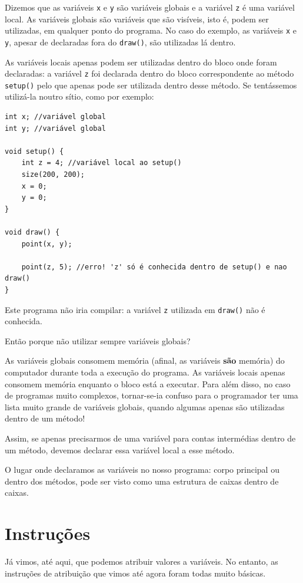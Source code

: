 Dizemos que as variáveis \texttt{x} e \texttt{y} são variáveis globais e a variável \texttt{z} é uma variável local.
As variáveis globais são variáveis que são visíveis, isto é, podem ser utilizadas, em qualquer ponto do programa. No caso do exemplo, as variáveis \texttt{x} e \texttt{y}, apesar de declaradas fora do \texttt{draw()}, são utilizadas lá dentro.

As variáveis locais apenas podem ser utilizadas dentro do bloco onde foram declaradas: a variável \texttt{z} foi declarada dentro do bloco correspondente ao método \texttt{setup()} pelo que apenas pode ser utilizada dentro desse método.
Se tentássemos utilizá-la noutro sítio, como por exemplo:
\begin{lstlisting}
int x; //variável global
int y; //variável global

void setup() {
    int z = 4; //variável local ao setup()	  
    size(200, 200);
    x = 0;
    y = 0;
}

void draw() {	
    point(x, y);
	
    point(z, 5); //erro! 'z' só é conhecida dentro de setup() e nao draw()
}
\end{lstlisting}
Este programa não iria compilar: a variável \texttt{z} utilizada em \texttt{draw()} não é conhecida.

Então porque não utilizar sempre variáveis globais? 

As variáveis globais consomem memória (afinal, as variáveis \textbf{são} memória) do computador durante toda a execução do programa. As variáveis locais apenas consomem memória enquanto o bloco está a executar. Para além disso, no caso de programas muito complexos, tornar-se-ia confuso para o programador ter uma lista muito grande de variáveis globais, quando algumas apenas são utilizadas dentro de um método!

Assim, se apenas precisarmos de uma variável para contas intermédias dentro de um método, devemos declarar essa variável local a esse método.

O lugar onde declaramos as variáveis no nosso programa: corpo principal ou dentro dos métodos, pode ser visto como uma estrutura de caixas dentro de caixas. 
\section{Instruções}
Já vimos, até aqui, que podemos atribuir valores a variáveis. No entanto, as instruções de atribuição que vimos até agora foram todas muito básicas. 

